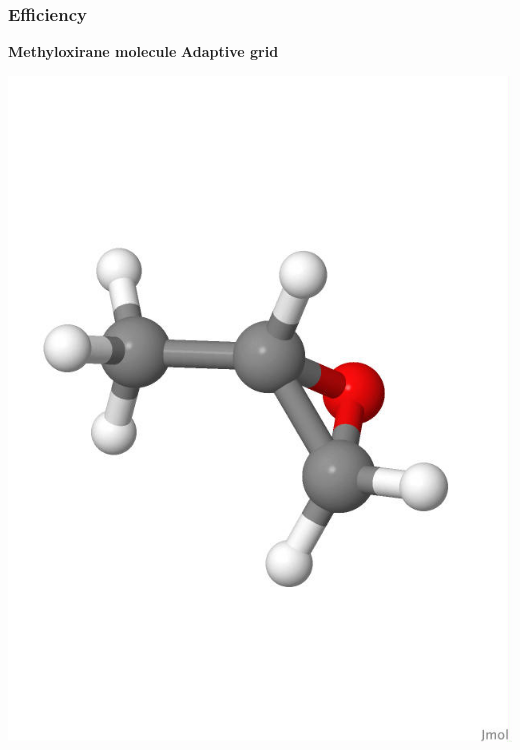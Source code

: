 \begin{frame}
\frametitle{Efficiency}
\scriptsize

\centering
\textbf{Methyloxirane molecule}
\hspace{30mm}
\textbf{Adaptive grid}
\begin{minipage}{0.5\textwidth}
\centering
\includegraphics[scale=0.15, viewport = 0 180 550 650, clip]{figures/methyloxirane_white.jpg}
\end{minipage}%
\begin{minipage}{0.5\textwidth}
\centering

\end{minipage}
\end{frame}
